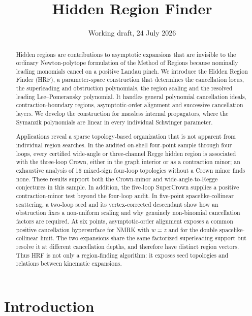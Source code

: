 \documentclass[a4paper,11pt]{article}
\title{\bfseries Hidden Region Finder}
\author{}
\date{Working draft, 24 July 2026}
\begin{document}
\maketitle

\begin{abstract}
Hidden regions are contributions to asymptotic expansions that are invisible
to the ordinary Newton-polytope formulation of the Method of Regions because
nominally leading monomials cancel on a positive Landau pinch.  We introduce
the Hidden Region Finder (HRF), a parameter-space construction that determines
the cancellation locus, the superleading and obstruction polynomials, the
region scaling and the resolved leading Lee--Pomeransky polynomial.  It
handles general polynomial cancellation ideals, contraction-boundary
regions, asymptotic-order alignment and successive cancellation layers.  We
develop the construction for massless internal propagators, where the
Symanzik polynomials are linear in every individual Schwinger parameter.

Applications reveal a sparse topology-based organization that is not apparent
from individual region searches.  In the audited on-shell four-point sample
through four loops, every certified wide-angle or three-channel Regge hidden
region is associated with the three-loop Crown, either in the graph interior
or as a contraction minor; an exhaustive analysis of 16 mixed-sign four-loop
topologies without a Crown minor finds none.  These results support both the
Crown-minor and wide-angle-to-Regge conjectures in this sample.  In
addition, the five-loop SuperCrown supplies a positive contraction-minor test
beyond the four-loop audit.  In five-point spacelike-collinear scattering, a two-loop seed and its
vertex-corrected descendant show how an obstruction fixes a non-uniform
scaling and why genuinely non-binomial cancellation factors are required.
At six points, asymptotic-order alignment exposes a common positive
cancellation hypersurface for NMRK with \(w=z\) and for the double
spacelike-collinear limit.  The two expansions share the same factorized
superleading support but resolve it at different cancellation depths, and
therefore have distinct region vectors.  Thus HRF is not only a region-finding
algorithm: it exposes seed topologies and relations between kinematic
expansions.
\end{abstract}

\tableofcontents

\section{Introduction}
\end{document}
